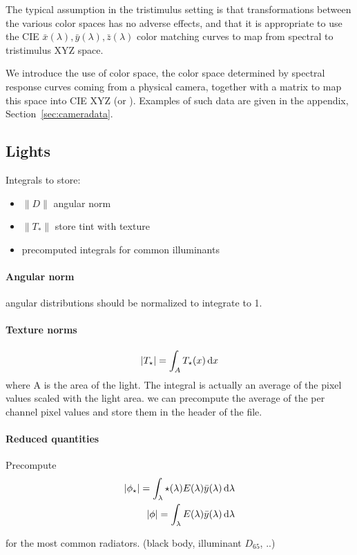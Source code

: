 The typical assumption in the tristimulus setting is that transformations
between the various color spaces has no adverse effects, and that it is
appropriate to use the \gls{CIE} $\bar x(\lambda), \bar y(\lambda), \bar z(\lambda)$
color matching curves to map from spectral to tristimulus \gls{XYZ} space.

We introduce the use of  color space, the color space
determined by spectral response curves coming from a physical camera, together
with a matrix to map this space into \gls{CIE} \gls{XYZ} (or \sRGBl). Examples
of such data are given in the appendix, Section~\ref{sec:cameradata}.


\subsection{Lights}

\begin{inconstruction}

Integrals to store:
\begin{itemize}
\item $\|D\|$ angular norm
\item $\|T_*\|$ store tint with texture
\item precomputed integrals for common illuminants
\end{itemize}

\paragraph{Angular norm}
angular distributions should be normalized to integrate to 1.

\paragraph{Texture norms}
\begin{displaymath}
|T_\star| = \int_A T_\star(x) \mathop{}\!\mathrm{d} x
\end{displaymath}
where A is the area of the light. The integral is actually an average of the
pixel values scaled with the light area. we can precompute the average of the
per channel pixel values and store them in the header of the file.

\paragraph{Reduced quantities}

Precompute
\begin{align*}
|\phi_\star| = \int_\lambda \star(\lambda) E(\lambda) \bar y(\lambda) \mathop{}\!\mathrm{d}\lambda\\
|\phi| = \int_\lambda E(\lambda) \bar y(\lambda) \mathop{}\!\mathrm{d}\lambda\\
\end{align*}

for the most common radiators. (black body, illuminant $D_{65}$, ..)

\end{inconstruction}


